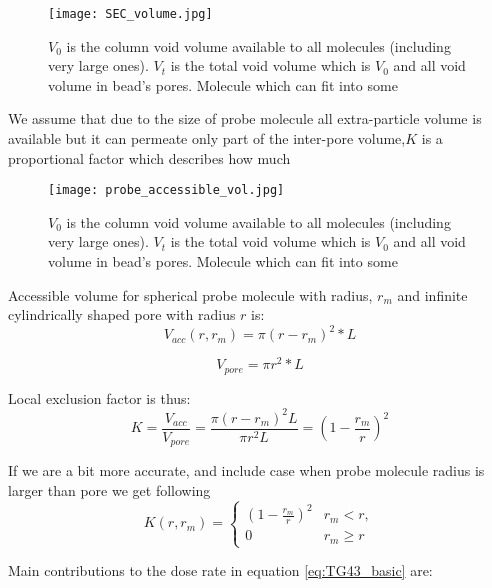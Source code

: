 \begin{figure}[h]
	\centering
    \texttt{[image: SEC\_volume.jpg]}
    \caption{$V_0$ is the column void volume available to all molecules
    (including very large ones). $V_t$ is the total void volume which is $V_0$
    and all void volume in bead's pores. Molecule which can fit into some}
	\label{fig1}
\end{figure}

We assume that due to the size of probe molecule all extra-particle volume is 
available but it can permeate only part of the inter-pore volume,$K$ is a proportional factor which describes how much 

\begin{figure}[h]
	\centering
    \texttt{[image: probe\_accessible\_vol.jpg]}
    \caption{$V_0$ is the column void volume available to all molecules
    (including very large ones). $V_t$ is the total void volume which is $V_0$
    and all void volume in bead's pores. Molecule which can fit into some}
	\label{fig1}
\end{figure}

Accessible volume for spherical probe molecule with radius, $r_m$ and 
infinite cylindrically shaped pore with radius $r$ is:
\begin{equation} \label{eq:acc_vol}
    V_{acc}(r, r_m) = \pi (r - r_m )^2 * L
\end{equation}

\begin{equation}
    V_{pore} = \pi r^2 * L
\end{equation}

Local exclusion factor is thus:
\begin{equation}
    K = \frac{V_{acc}}{V_{pore}} = \frac{\pi (r-r_m)^2 L}{\pi r^2 L} = \left(1 -
    \frac{r_m}{r}\right)^2
\end{equation}

If we are a bit more accurate, and include case when probe molecule radius is
larger than pore we get following
\begin{equation}
	K(r, r_m) = 
	\begin{cases}
        \left(1 - \frac{r_m}{r}\right)^2 & r_m < r,  \\
		0           & r_m \geq r
	\end{cases}
\end{equation}



Main contributions to the dose rate in equation \ref{eq:TG43_basic} are:

